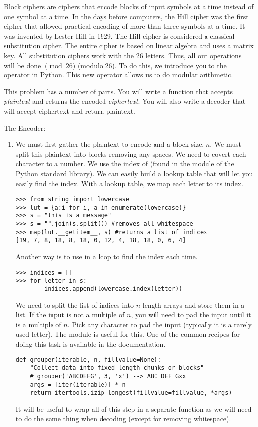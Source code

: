 \begin{problem}
Block ciphers are ciphers that encode blocks of input symbols at a time instead of one symbol at a time.
In the days before computers, the Hill cipher was the first cipher that allowed practical encoding of more than three symbols at a time.
It was invented by Lester Hill in 1929.
The Hill cipher is considered a classical substitution cipher.
The entire cipher is based on linear algebra and uses a matrix key.
All substitution ciphers work with the 26 letters.
Thus, all our operations will be done $\pmod{26}$ (modulo 26).
To do this, we introduce you to the \li{\%} operator in Python.
This new operator allows us to do modular arithmetic.

This problem has a number of parts.  You will write a function that accepts \emph{plaintext} and returns the encoded \emph{ciphertext}.
You will also write a decoder that will accept ciphertext and return plaintext.

The Encoder:
\begin{enumerate}
\item We must first gather the plaintext to encode and a block size, $n$.  
We must split this plaintext into blocks removing any spaces.  We need to covert each character to a number.
We use the index of  (found in the  module of the Python standard library).
We can easily build a lookup table that will let you easily find the index.
With a lookup table, we map each letter to its index.
\begin{lstlisting}
>>> from string import lowercase
>>> lut = {a:i for i, a in enumerate(lowercase)}
>>> s = "this is a message"
>>> s = "".join(s.split()) #removes all whitespace
>>> map(lut.__getitem__, s) #returns a list of indices
[19, 7, 8, 18, 8, 18, 0, 12, 4, 18, 18, 0, 6, 4]
\end{lstlisting}
Another way is to use  in a loop to find the index each time.
\begin{lstlisting}
>>> indices = []
>>> for letter in s:
        indices.append(lowercase.index(letter))
\end{lstlisting}
We need to split the list of indices into $n$-length arrays and store them in a list.
If the input is not a multiple of $n$, you will need to pad the input until it is a multiple of $n$.
Pick any character to pad the input (typically it is a rarely used letter).
The  module is useful for this.  One of the common recipes for doing this task is available in the  documentation.  
\begin{lstlisting}
def grouper(iterable, n, fillvalue=None):
    "Collect data into fixed-length chunks or blocks"
    # grouper('ABCDEFG', 3, 'x') --> ABC DEF Gxx
    args = [iter(iterable)] * n
    return itertools.izip_longest(fillvalue=fillvalue, *args)
\end{lstlisting}
It will be useful to wrap all of this step in a separate function as we will need to do the same thing when decoding (except for removing whitespace).


\end{enumerate}
\end{problem}

